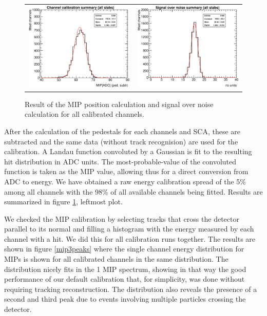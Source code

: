 \documentclass[a4paper,11pt]{article}
\begin{document}
\begin{figure}[!t]
  \centering
  \begin{tabular}{ll}
      \includegraphics[width=2.8in]{figs/MIP/MIPsummary_title.eps} & \includegraphics[width=2.8in]{figs/MIP/SNsummary_title.eps}  
  \end{tabular}
\caption{Result of the MIP position calculation and signal over noise calculation for all calibrated channels.}
\label{mipandSN}
\end{figure}
  

After the calculation of the pedestals for each channels and SCA, these are subtracted and the same data (without track
recognision) are used for the calibration.
A Landau function convoluted by a Gaussian is fit to the resulting hit distribution
in ADC units.
The most-probable-value of the convoluted function is taken as the MIP value, allowing thus for a direct
conversion from ADC to energy.
We have obtained a raw energy calibration spread of the 5\% among all channels with the 98\% of all 
available channels being fitted. Results are summarized in figure \ref{mipandSN}, leftmost plot.

We checked the MIP 
calibration by selecting tracks that cross the detector parallel to its normal
and filling a histogram with the energy measured by each channel with a hit.
We did this for all calibration runs together.
The results are shown in figure \ref{mip3peaks} where the single channel energy 
distribution for MIPs is shown for all calibrated channels in the same distribution. 
The distribution nicely fits in the 1 MIP spectrum, showing in that way the good
performance of our default calibration that, for simplicity, was done without requiring
tracking reconstruction.
The distribution also reveals the presence of a second and third peak due to events involving multiple 
particles crossing the detector.
\end{document}
